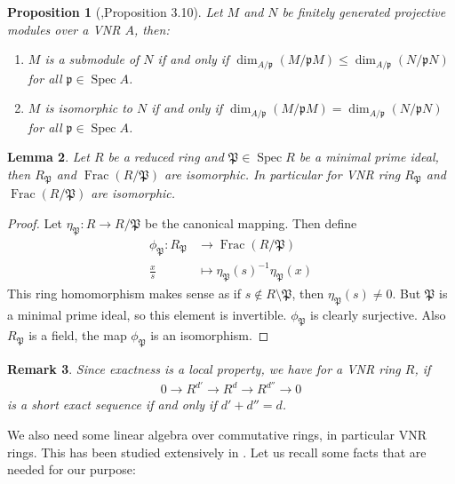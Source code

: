 \documentclass{amsart}
\newtheorem{proposition}{Proposition}[section]
\newtheorem{lemma}[proposition]{Lemma}
\newtheorem{remark}[proposition]{Remark}
\DeclareMathOperator{\Frac}{Frac}
\DeclareMathOperator{\spec}{Spec}
\begin{document}
\begin{proposition}[\cite{Good},Proposition 3.10]\label{Projective module over a VNR ring}
    Let $M$ and $N$ be finitely generated projective modules over a VNR $A$, then:
    \begin{enumerate}
        \item[(i)] $M$ is a submodule of $N$ if and only if $\dim_{A/\mathfrak{p}}(M/{\mathfrak{p}}M)\leq \dim_{A/\mathfrak{p}}(N/\mathfrak{p}N)$ for all $\mathfrak{p}\in\spec A$.
        \item[(ii)] $M$ is isomorphic to $N$ if and only if $\dim_{A/\mathfrak{p}}(M/{\mathfrak{p}}M)= \dim_{A/\mathfrak{p}}(N/\mathfrak{p}N)$ for all $\mathfrak{p}\in\spec A$.
    \end{enumerate}
\end{proposition}

\begin{lemma}
    Let $R$ be a reduced ring and $\mathfrak{P}\in\spec R$ be a minimal prime ideal, then $R_{\mathfrak{P}}$ and $\Frac(R/\mathfrak{P})$ are isomorphic. In particular for VNR ring $R_{\mathfrak{P}}$ and $\Frac(R/\mathfrak{P})$ are isomorphic.
\end{lemma}

\begin{proof}
    Let $\eta_{\mathfrak{P}}:R\to R/\mathfrak{P}$ be the canonical mapping. Then define
    \begin{align*}
        \phi_{\mathfrak{P}}:R_{\mathfrak{P}}&\to \Frac(R/\mathfrak{P})\\
                                 \frac{x}{s}&\mapsto \eta_{\mathfrak{P}}(s)^{-1}\eta_{\mathfrak{P}}(x)
    \end{align*}
    This ring homomorphism makes sense as if $s\notin R\setminus\mathfrak{P}$, then $\eta_{\mathfrak{P}}(s)\neq 0$. But $\mathfrak{P}$ is a minimal prime ideal, so this element is invertible. $\phi_{\mathfrak{P}}$ is clearly surjective. Also $R_{\mathfrak{P}}$ is a field, the map $\phi_{\mathfrak{P}}$ is an isomorphism.
\end{proof}

\begin{remark}
    Since exactness is a local property, we have for a VNR ring $R$, if 
    \begin{align*}
        0\to R^{d'}\to R^d\to R^{d''}\to 0
    \end{align*}
    is a short exact sequence if and only if $d'+d''=d$.
\end{remark}


We also need some linear algebra over commutative rings, in particular VNR rings. This has been studied extensively in \cite{William}. Let us recall some facts that are needed for our purpose:\\
\end{document}
